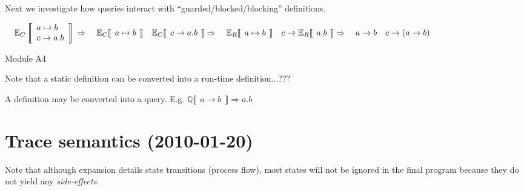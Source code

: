 \documentclass[11pt]{article}
\begin{document}
Next we investigate how queries interact with ``guarded/blocked/blocking'' definitions.
\begin{example}[H]
$
  \hspace*{1em}
  \mathbb{E}_{C} \left \llbracket 
  \begin{array}{l}
    a \mapsto b \\
    c \rightarrow a . b
  \end{array} \right \rrbracket \\\\
\Rightarrow \\\\
  \hspace*{1em} \mathbb{E}_{C} \llbracket \:\: a \mapsto b \:\: \rrbracket \\
  \hspace*{1em} \mathbb{E}_{C} \llbracket \:\: c \rightarrow a.b \:\: \rrbracket \\\\
\Rightarrow \\\\
  \hspace*{1em} \mathbb{E}_{R} \llbracket \:\: a \mapsto b \:\: \rrbracket \\
  \hspace*{1em} c \rightarrow \mathbb{E}_{R} \llbracket \:\: a.b \:\: \rrbracket \\\\
\Rightarrow \\\\
  \hspace*{1em} a \rightarrow b \\
  \hspace*{1em} c \rightarrow (a \rightarrow b)
$
\caption{Module A4}
\end{example}

Note that a static definition can be converted into a run-time definition...???

A definition may be converted into a query.
E.g. $\mathbb{Q} \llbracket \:\: a \rightarrow b \:\: \rrbracket \Rightarrow a.b$


\section{Trace semantics (2010-01-20)}

Note that although expansion details state transitions (process flow), most states will not be ignored in the final program because they do not yield any \emph{side-effects}.
\end{document}
